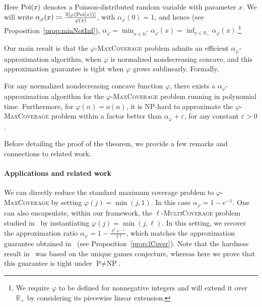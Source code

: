 Here $\operatorname{\text{Poi}}(x)$ denotes a Poisson-distributed random variable with parameter $x$. We will write $\alpha_{\varphi}(x) \coloneqq \frac{\mathbb{E}[\varphi(\operatorname{\text{Poi}}(x))]}{\varphi(x)}$, with $\alpha_{\varphi}(0) = 1$, and hence (see Proposition~\ref{prop:minNotInf}), $\alpha_{\varphi}  = \min_{x \in  \mathbb{N}^*} \alpha_{\varphi}(x) = \inf_{x \in \mathbb{R}_+} \alpha_{\varphi}(x)$.\footnote{We require $\varphi$ to be defined for nonnegative integers and will extend it over $\mathbb{R}_+$ by considering its piecewise linear extension.}

Our main result is that the $\varphi$-\textsc{MaxCoverage} problem admits an efficient $\alpha_\varphi$-approximation algorithm, when $\varphi$ is normalized nondecreasing concave, and this approximation guarantee is tight when $\varphi$ grows sublinearly. Formally,  

\begin{theorem}
For any normalized nondecreasing concave function $\varphi$, there exists a $\alpha_\varphi$-approximation algorithm for the $\varphi$-\textsc{MaxCoverage} problem running in polynomial time. Furthermore, for $\varphi(n) = o(n)$, it is \textrm{NP}-hard to approximate the $\varphi$-\textsc{MaxCoverage} problem within a factor better than $\alpha_\varphi + \varepsilon$, for any constant $\varepsilon >0$.
\label{theo:main}
\end{theorem}

Before detailing the proof of the theorem, we provide a few remarks and connections to related work.

\paragraph{Applications and related work}
We can directly reduce the standard maximum coverage problem to $\varphi$-\textsc{MaxCoverage} by setting $\varphi(j) = \min(j,1)$. In this case $\alpha_{\varphi} = 1 - e^{-1}$. One can also encapsulate, within our framework, the $\ell$-\textsc{MultiCoverage} problem studied in~\cite{BFGG20} by instantiating $\varphi(j) = \min(j,\ell)$. In this setting, we recover the approximation ratio $\alpha_{\varphi} = 1-\frac{\ell^{\ell}e^{-\ell}}{\ell!}$, which matches the approximation guarantee obtained in~\cite{BFGG20} (see Proposition~\ref{prop:lCover}). Note that the hardness result in~\cite{BFGG20} was based on the unique games conjecture, whereas here we prove that this guarantee is tight under $\textrm{P} \not= \textrm{NP}$.

